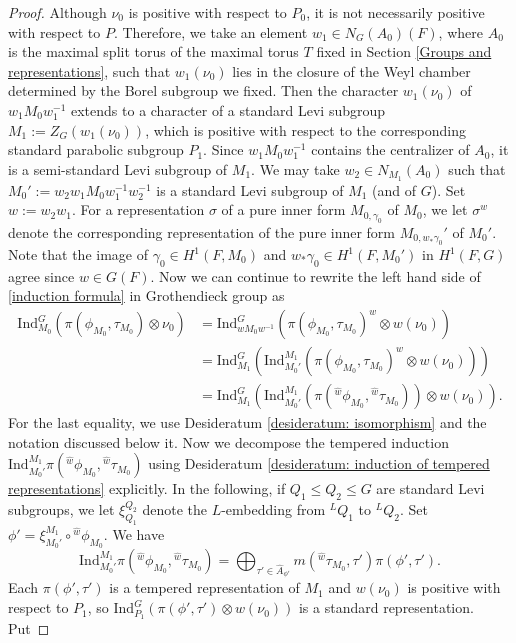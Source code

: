 \documentclass[11pt,letterpaper]{amsart}
\newcommand{\Ind}{\mathrm{Ind}}
\renewcommand{\1}{\mathbbm{1}}
\numberwithin{equation}{section}
\begin{document}
{\begin{proof}
    Although $\nu_0$ is positive with respect to $P_0$, it is not necessarily positive with respect to $P$. 
    Therefore, we take an element $w_1 \in N_G(A_0)(F)$, where $A_0$ is the maximal split torus of the maximal torus $T$ fixed in Section \ref{Groups and representations}, such that $w_1(\nu_0)$ lies in the closure of the Weyl chamber determined by the Borel subgroup we fixed. Then the character $w_1(\nu_0)$ of $w_1M_0w_1^{-1}$ extends to a character of a standard Levi subgroup $M_1:= Z_{G}(w_1(\nu_0))$, which is positive with respect to the corresponding standard parabolic subgroup $P_1$. Since $w_1M_0w_1^{-1}$ contains the centralizer of $A_0$, it is a semi-standard Levi subgroup of $M_1$. We may take $w_2 \in N_{M_1}(A_0)$ such that $M_0':= w_2w_1M_0w_1^{-1}w_2^{-1}$ is a standard Levi subgroup of $M_1$ (and of $G$). Set $w:=w_2w_1$. For a representation $\sigma$ of a pure inner form $M_{0,\gamma_0}$ of $M_0$, we let $\sigma^w$ denote the corresponding representation of the pure inner form $M_{0,w_{\ast}\gamma_0}'$ of $M_0'$. Note that the image of $\gamma_0 \in H^1(F,M_0) $ and $w_{\ast}\gamma_0 \in H^1(F,M_0')$ in  $ H^1(F,G)$ agree since $w \in G(F)$.
    Now we can continue to rewrite the left hand side of \eqref{induction formula} in Grothendieck group as  
\begin{align*}
     \Ind_{M_0}^G (\pi(\phi_{M_0},\tau_{M_0}) \otimes \nu_0)&=\Ind_{w M_0 w^{-1}}^G (\pi(\phi_{M_0},\tau_{M_0})^w \otimes w(\nu_0))\\
     &=\Ind_{M_1}^G (\Ind_{M_0'}^{M_1} (\pi(\phi_{M_0},\tau_{M_0})^w \otimes w(\nu_0)))\\
     &=\Ind_{M_1}^G (\Ind_{M_0'}^{M_1} (\pi({}^{\widehat{w}}\phi_{M_0},{}^{\widehat{w}}\tau_{M_0}) )\otimes w(\nu_0)).
\end{align*}
For the last equality, we use Desideratum \ref{desideratum: isomorphism} and the notation discussed below it. Now we decompose the tempered induction $\Ind_{M_0'}^{M_1}\pi({}^{\widehat{w}}\phi_{M_0},{}^{\widehat{w}}\tau_{M_0})$ using Desideratum \ref{desideratum: induction of tempered representations} explicitly. In the following, if $Q_1 \leq Q_2 \leq G$ are standard Levi subgroups, we let $\xi_{Q_1}^{Q_2}$ denote the $L$-embedding from ${}^L Q_1$ to ${}^L Q_2$.    Set $\phi'={\xi_{M_0'}^{M_1}} \circ {}^{\widehat{w}} \phi_{M_0}$. We have
\[\Ind_{M_0'}^{M_1}\pi({}^{\widehat{w}}\phi_{M_0},{}^{\widehat{w}}\tau_{M_0})= \bigoplus_{\tau' \in \widehat{A}_{\phi'} } m( {}^{\widehat{w}}\tau_{M_0},\tau') \pi(\phi', \tau').\]
Each $\pi(\phi',\tau')$ is a tempered representation of $M_1$ and $w(\nu_0)$ is positive with respect to $P_1$, so  $\Ind_{P_1}^G(\pi(\phi',\tau')\otimes w(\nu_0))$ is a standard representation. Put

\end{proof}}
\end{document}
